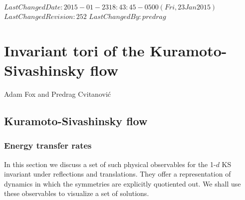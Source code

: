 {$LastChangedDate: 2015-01-23 18:43:45 -0500 (Fri, 23 Jan 2015) $}
{$LastChangedRevision: 252 $} {$LastChangedBy: predrag $}

  \renewcommand{\ssp}{x}            %
  \newcommand{\eps}{\varepsilon}

\chapter{Invariant tori of the Kuramoto-Sivashinsky flow}
\label{chap:KStori}

\hfill  Adam Fox and Predrag Cvitanovi\'c


\section{Kuramoto-Sivashinsky flow}
\label{sec:KS}

\subsection{Energy transfer rates}
\label{sec:energy}

In this section we discuss a set of such physical observables for the
1-$d$ KS invariant under reflections and translations. They offer a
representation of dynamics in which the symmetries are explicitly
quotiented out. We shall use these {observables}
to visualize a set of solutions.

